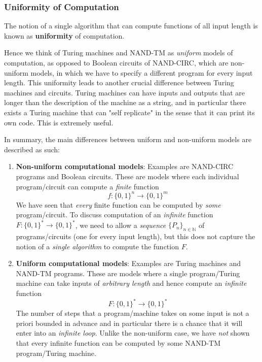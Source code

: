   \subsubsection{Uniformity of Computation}
  \begin{definition}
  The notion of a single algorithm that can compute functions of all input length is known as \textbf{uniformity} of computation. 
  \end{definition}

  Hence we think of Turing machines and NAND-TM as \textit{uniform} models of computation, as opposed to Boolean circuits of NAND-CIRC, which are non-uniform models, in which we have to specify a different program for every input length. This uniformity leads to another crucial difference between Turing machines and circuits. Turing machines can have inputs and outputs that are longer than the description of the machine as a string, and in particular there exists a Turing machine that can "self replicate" in the sense that it can print its own code. This is extremely useful. 

  In summary, the main differences between uniform and non-uniform models are described as such: 
  \begin{enumerate}
      \item \textbf{Non-uniform computational models}: Examples are NAND-CIRC programs and Boolean circuits. These are models where each individual program/circuit can compute a \textit{finite} function 
      \[f: \{0,1\}^n \longrightarrow \{0,1\}^m\]
      We have seen that \textit{every} finite function can be computed by \textit{some} program/circuit. To discuss computation of an \textit{infinite} function $F: \{0,1\}^* \longrightarrow \{0,1\}^*$, we need to allow a \textit{sequence} $\big\{ P_n \big\}_{n \in \mathbb{N}}$ of programs/circuits (one for every input length), but this does not capture the notion of a \textit{single algorithm} to compute the function $F$. 
      \item \textbf{Uniform computational models}: Examples are Turing machines and NAND-TM programs. These are models where a single program/Turing machine can take inputs of \textit{arbitrary length} and hence compute an \textit{infinite} function 
      \[F: \{0,1\}^* \longrightarrow \{0,1\}^* \]
      The number of steps that a program/machine takes on some input is not a priori bounded in advance and in particular there is a chance that it will enter into an \textit{infinite loop}. Unlike the non-uniform case, we have \textit{not} shown that every infinite function can be computed by some NAND-TM program/Turing machine. 
  \end{enumerate}

